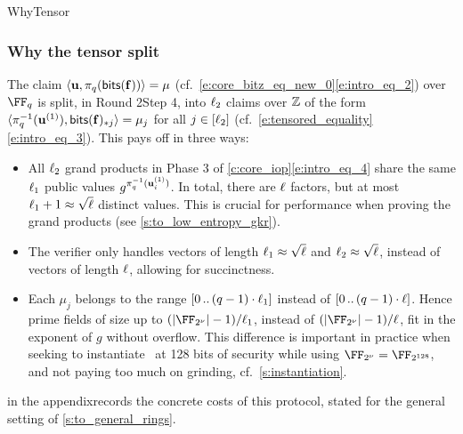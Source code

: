 \begin{lncsmove}{WhyTensor}
\iflncs\begin{remark}\label{s:why_the_tensor_split}\else\subsubsection{Why the tensor split}\label{s:why_the_tensor_split}\fi{} The claim $\langle \mathbf{u}, \pi_q(\mathsf{bits}(\mathbf{f}))\rangle = \mu$ (cf.\  \iflncs\eqref{e:core_bitz_eq_new_0}\else\eqref{e:intro_eq_2}\fi) over $\FF_q$ is split, in \iflncs Round 2\else Step 4\fi, into $\ell_2$ claims over $\mathbb{Z}$ of the form 
$
\langle \pi_q^{-1}(\mathbf{u}^{(1)}), \mathsf{bits}(\mathbf{f})_{*j}\rangle =\mu_j$ for all  $j\in [\ell_2]$ (cf.\ \iflncs\eqref{e:tensored_equality}\else\eqref{e:intro_eq_3}\fi).  This pays off in three ways:
\begin{itemize}[leftmargin=*,nosep]
    \item All $\ell_2$ grand products in \iflncs Phase 3 of \cref{c:core_iop}\else\eqref{e:intro_eq_4}\fi{} share the same $\ell_1$ public values $g^{\pi_q^{-1}(\mathbf{u}_i^{(1)})}$. In total, there are $\ell$ factors, but at most $\ell_1+1\approx \sqrt{\ell}$ distinct values. This is crucial for performance when proving the grand products (see \cref{s:to_low_entropy_gkr}).
    \item The verifier only handles vectors of length $\ell_1 \approx \sqrt{\ell}$ and $\ell_2\approx \sqrt{\ell}$, instead of vectors of length $\ell$, allowing for succinctness. 
    \item Each $\mu_j$ belongs to the range $[0 \, .. \, (q-1)\cdot \ell_1]$ instead of $[0 \, .. \, (q-1)\cdot \ell]$. Hence prime fields of size up to $(|\comfield|-1)/\codedim_1$, instead of $(|\comfield|-1)/\codedim$, fit in the exponent of $g$ without overflow. This difference is important in practice when seeking to instantiate \ftwoz\ at 128 bits of security while using $\comfield=\FF_{2^{128}}$, and not paying too much on grinding, cf.\ \cref{s:instantiation}. %
\end{itemize}

 \iflncs in the appendix\else\fi records the concrete costs of this protocol\iflncs\else, stated for the general setting of \cref{s:to_general_rings}\fi.
\iflncs\end{remark}\fi



\end{lncsmove}
